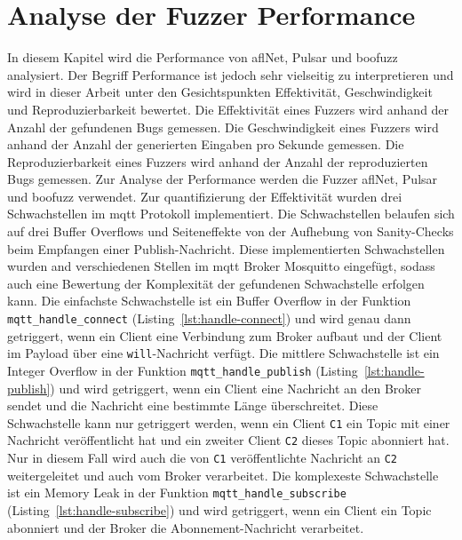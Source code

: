 
\section{Analyse der Fuzzer Performance}\label{sec:analyse-der-performance}
In diesem Kapitel wird die Performance von \gls{afl}Net, Pulsar und boofuzz analysiert.
Der Begriff Performance ist jedoch sehr vielseitig zu interpretieren und wird in dieser Arbeit unter den Gesichtspunkten
Effektivität, Geschwindigkeit und Reproduzierbarkeit bewertet.\newline
Die Effektivität eines Fuzzers wird anhand der Anzahl der gefundenen Bugs gemessen.
Die Geschwindigkeit eines Fuzzers wird anhand der Anzahl der generierten Eingaben pro Sekunde gemessen.
Die Reproduzierbarkeit eines Fuzzers wird anhand der Anzahl der reproduzierten Bugs gemessen.
Zur Analyse der Performance werden die Fuzzer \gls{afl}Net, Pulsar und boofuzz verwendet.\newline\newline
Zur quantifizierung der Effektivität wurden drei Schwachstellen im \gls{mqtt} Protokoll implementiert.
Die Schwachstellen belaufen sich auf drei Buffer Overflows und Seiteneffekte von der Aufhebung von Sanity-Checks beim
Empfangen einer Publish-Nachricht.
Diese implementierten Schwachstellen wurden and verschiedenen Stellen im \gls{mqtt} Broker Mosquitto eingefügt, sodass
auch eine Bewertung der Komplexität der gefundenen Schwachstelle erfolgen kann.
Die einfachste Schwachstelle ist ein Buffer Overflow in der Funktion \texttt{mqtt\_handle\_connect} (Listing~\ref{lst:handle-connect}) und wird genau dann
getriggert, wenn ein Client eine Verbindung zum Broker aufbaut und der Client im Payload über eine \texttt{will}-Nachricht
verfügt.
Die mittlere Schwachstelle ist ein Integer Overflow in der Funktion \texttt{mqtt\_handle\_publish} (Listing~\ref{lst:handle-publish}) und wird getriggert,
wenn ein Client eine Nachricht an den Broker sendet und die Nachricht eine bestimmte Länge überschreitet.
Diese Schwachstelle kann nur getriggert werden, wenn ein Client \texttt{C1} ein Topic mit einer Nachricht veröffentlicht hat und ein
zweiter Client \texttt{C2} dieses Topic abonniert hat.
Nur in diesem Fall wird auch die von \texttt{C1} veröffentlichte Nachricht an \texttt{C2} weitergeleitet und auch vom Broker verarbeitet.
Die komplexeste Schwachstelle ist ein Memory Leak in der Funktion \texttt{mqtt\_handle\_subscribe} (Listing~\ref{lst:handle-subscribe}) und wird getriggert,
wenn ein Client ein Topic abonniert und der Broker die Abonnement-Nachricht verarbeitet.



